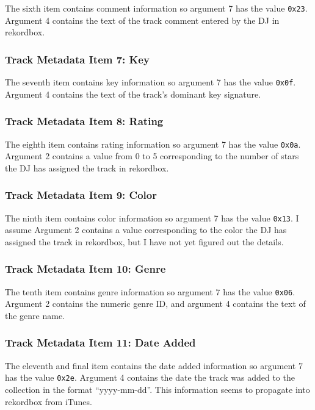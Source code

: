 \documentclass[11pt]{article}
\begin{document}
The sixth item contains comment information so argument 7 has the
value {\tt 0x23}. Argument 4 contains the text of the track comment
entered by the DJ in rekordbox.

\subsubsection{Track Metadata Item 7: Key}

The seventh item contains key information so argument 7 has the value
{\tt 0x0f}. Argument 4 contains the text of the track's dominant key
signature.

\subsubsection{Track Metadata Item 8: Rating}

The eighth item contains rating information so argument 7 has the
value {\tt 0x0a}. Argument 2 contains a value from 0 to 5
corresponding to the number of stars the DJ has assigned the track in
rekordbox.

\subsubsection{Track Metadata Item 9: Color}

The ninth item contains color information so argument 7 has the value
{\tt 0x13}. I assume Argument 2 contains a value corresponding to the
color the DJ has assigned the track in rekordbox, but I have not yet
figured out the details.

\subsubsection{Track Metadata Item 10: Genre}

The tenth item contains genre information so argument 7 has the value
{\tt 0x06}. Argument 2 contains the numeric genre ID, and argument 4
contains the text of the genre name.

\subsubsection{Track Metadata Item 11: Date Added}

The eleventh and final item contains the date added information so
argument 7 has the value {\tt 0x2e}. Argument 4 contains the date the
track was added to the collection in the format ``yyyy-mm-dd''. This
information seems to propagate into rekordbox from iTunes.
\end{document}
